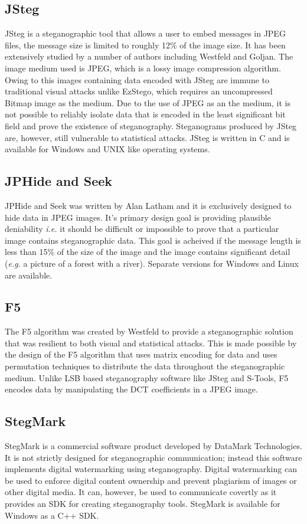 \subsection{JSteg} 
JSteg \cite{jsteg} is a steganographic tool that allows a user to embed messages in JPEG files, the message size is limited to roughly 12\% of the image size. It has been extensively studied by a number of authors including Westfeld and Goljan. The image medium used is JPEG, which is a lossy image compression algorithm. Owing to this images containing data encoded with JSteg are immune to traditional visual attacks unlike EzStego, which requires an uncompressed Bitmap image as the medium. Due to the use of JPEG as an the medium, it is not possible to reliably isolate data that is encoded in the least significant bit field and prove the existence of steganography. Steganograms produced by JSteg are, however, still vulnerable to statistical attacks. JSteg is written in C and is available for Windows and UNIX like operating systems.
\subsection{JPHide and Seek}
JPHide and Seek \cite{jphide} was written by Alan Latham and it is exclusively designed to hide data in JPEG images. It's primary design goal is providing plausible deniability \emph{i.e.} it should be difficult or impossible to prove that a particular image contains steganographic data. This goal is acheived if the message length is less than 15\% of the size of the image and the image contains significant detail (\emph{e.g.} a picture of a forest with a river). Separate versions for Windows and Linux are available.
 \subsection{F5}
 The F5 algorithm \cite{westfeld2001f5} was created by Westfeld to provide a steganographic solution that was resilient to both visual and statistical attacks. This is made possible by the design of the F5 algorithm that uses matrix encoding for data and uses permutation techniques to distribute the data throughout the steganographic medium. Unlike LSB based steganography software like JSteg and S-Tools, F5 encodes data by manipulating the DCT coefficients in a JPEG image. 
 \subsection{StegMark}
 StegMark \cite{stegmark} is a commercial software product developed by DataMark Technologies. It is not strictly designed for steganographic communication; instead this software implements digital watermarking using steganography. Digital watermarking can be used to enforce digital content ownership and prevent plagiarism of images or other digital media. It can, however, be used to communicate covertly as it provides an SDK for creating steganography tools. StegMark is available for Windows as a C++ SDK.

